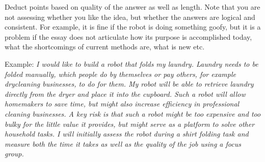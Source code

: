 \documentclass[letter,twoside,11pt]{article}
\begin{document}
Deduct points based on quality of the answer as well as length. Note that you are not assessing whether you like the idea, but whether the answers are logical and consistent. For example, it is fine if the robot is doing something goofy, but it is a problem if the essay does not articulate how its purpose is accomplished today, what the shortcomings of current methods are, what is new etc.

Example: \emph{I would like to build a robot that folds my laundry. Laundry needs to be folded manually, which people do by themselves or pay others, for example drycleaning businesses, to do for them. My robot will be able to retrieve laundry directly from the dryer and place it into the cupboard. Such a robot will allow homemakers to save time, but might also increase efficiency in professional cleaning businesses. A key risk is that such a robot might be too expensive and too bulky for the little value it provides, but might serve as a platform to solve other household tasks. I will initially assess the robot during a shirt folding task and measure both the time it takes as well as the quality of the job using a focus group.}
\end{document}
